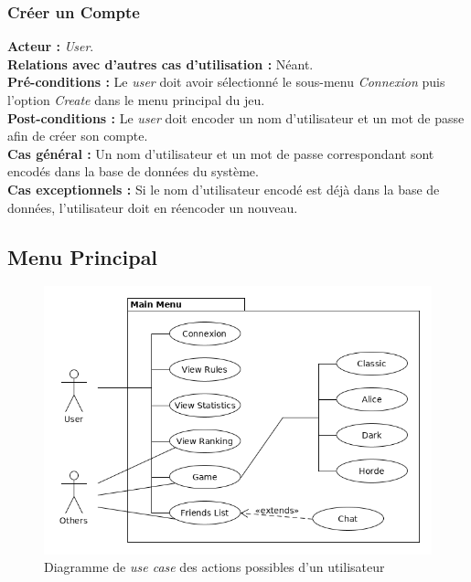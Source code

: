\documentclass[10pt, a4paper]{article}
\begin{document}
\subsubsection{Créer un Compte}
\textbf{Acteur :} \textit{User}.\\
\textbf{Relations avec d'autres cas d'utilisation :} Néant.\\
\textbf{Pré-conditions :} Le \textit{user} doit avoir sélectionné le sous-menu \textit{Connexion} puis l'option {\itshape Create} dans le menu principal du jeu.\\
\textbf{Post-conditions :} Le \textit{user} doit encoder un nom d'utilisateur et un mot de passe afin de créer son compte.\\
\textbf{Cas général :} Un nom d'utilisateur et un mot de passe correspondant sont encodés dans la base de données du système.\\
\textbf{Cas exceptionnels :} Si le nom d'utilisateur encodé est déjà dans la base de données, l'utilisateur doit en réencoder un nouveau.



\subsection{Menu Principal}

\begin{figure}[ht]
\begin{center}
\includegraphics[scale=0.5]{UC_mainmenu.png}
\caption{Diagramme de \textit{use case} des actions possibles d'un utilisateur}
\label{UC_menu} %
\end{center}
\end{figure}
\end{document}
